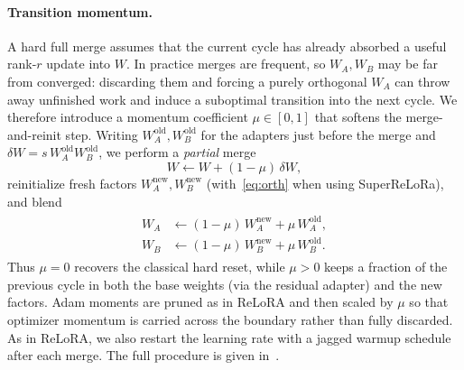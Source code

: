 \paragraph{Transition momentum.}
A hard full merge assumes that the current cycle has already absorbed a useful rank-$r$ update into $W$.
In practice merges are frequent, so $W_A,W_B$ may be far from converged: discarding them and forcing a purely orthogonal $W_A$ can throw away unfinished work and induce a suboptimal transition into the next cycle.
We therefore introduce a momentum coefficient $\mu \in [0,1]$ that softens the merge-and-reinit step.
Writing $W_A^{\mathrm{old}},W_B^{\mathrm{old}}$ for the adapters just before the merge and $\delta W = s\, W_A^{\mathrm{old}} W_B^{\mathrm{old}}$, we perform a \emph{partial} merge
\begin{equation}
W \leftarrow W + (1-\mu)\, \delta W,
\label{eq:partial_merge}
\end{equation}
reinitialize fresh factors $W_A^{\mathrm{new}},W_B^{\mathrm{new}}$ (with~\eqref{eq:orth} when using SuperReLoRa), and blend
\begin{align}
\begin{split}
W_A &\leftarrow (1-\mu)\, W_A^{\mathrm{new}} + \mu\, W_A^{\mathrm{old}},\\
W_B &\leftarrow (1-\mu)\, W_B^{\mathrm{new}} + \mu\, W_B^{\mathrm{old}}.
\end{split}
\label{eq:reinit_momentum}
\end{align}
Thus $\mu{=}0$ recovers the classical hard reset, while $\mu{>}0$ keeps a fraction of the previous cycle in both the base weights (via the residual adapter) and the new factors.
Adam moments are pruned as in ReLoRA and then scaled by $\mu$ so that optimizer momentum is carried across the boundary rather than fully discarded.
As in ReLoRA, we also restart the learning rate with a jagged warmup schedule after each merge.
The full procedure is given in~.


